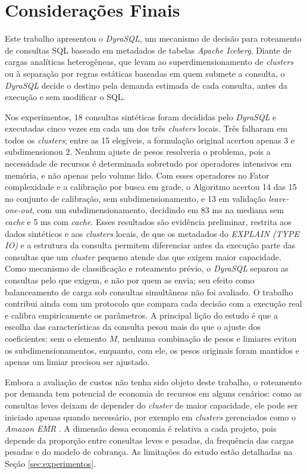 \FloatBarrier
\section{Considerações Finais}
\label{sec:consideracoes-finais}
\label{sec:con}

Este trabalho apresentou o \textit{DyraSQL}, um mecanismo de decisão para roteamento de consultas SQL baseado em metadados de tabelas \textit{Apache Iceberg}. Diante de cargas analíticas heterogêneas, que levam ao superdimensionamento de \textit{clusters} ou à separação por regras estáticas baseadas em quem submete a consulta, o \textit{DyraSQL} decide o destino pela demanda estimada de cada consulta, antes da execução e sem modificar o SQL.

Nos experimentos, 18 consultas sintéticas foram decididas pelo \textit{DyraSQL} e executadas cinco vezes em cada um dos três \textit{clusters} locais. Três falharam em todos os \textit{clusters}; entre as 15 elegíveis, a formulação original acertou apenas 3 e subdimensionou 2. Nenhum ajuste de pesos resolveria o problema, pois a necessidade de recursos é determinada sobretudo por operadores intensivos em memória, e não apenas pelo volume lido. Com esses operadores no Fator complexidade e a calibração por busca em grade, o Algoritmo acertou 14 das 15 no conjunto de calibração, sem subdimensionamento, e 13 em validação \textit{leave-one-out}, com um subdimensionamento, decidindo em 83 ms na mediana sem \textit{cache} e 5 ms com \textit{cache}. Esses resultados são evidência preliminar, restrita aos dados sintéticos e aos \textit{clusters} locais, de que os metadados do \textit{EXPLAIN (TYPE IO)} e a estrutura da consulta permitem diferenciar antes da execução parte das consultas que um \textit{cluster} pequeno atende das que exigem maior capacidade. Como mecanismo de classificação e roteamento prévio, o \textit{DyraSQL} separou as consultas pelo que exigem, e não por quem as envia; seu efeito como balanceamento de carga sob consultas simultâneas não foi avaliado. O trabalho contribui ainda com um protocolo que compara cada decisão com a execução real e calibra empiricamente os parâmetros. A principal lição do estudo é que a escolha das características da consulta pesou mais do que o ajuste dos coeficientes: sem o elemento $M$, nenhuma combinação de pesos e limiares evitou os subdimensionamentos, enquanto, com ele, os pesos originais foram mantidos e apenas um limiar precisou ser ajustado.

Embora a avaliação de custos não tenha sido objeto deste trabalho, o roteamento por demanda tem potencial de economia de recursos em alguns cenários: como as consultas leves deixam de depender do \textit{cluster} de maior capacidade, ele pode ser iniciado apenas quando necessário, por exemplo em \textit{clusters} gerenciados como o \textit{Amazon EMR} \cite{awsemr2025}. A dimensão dessa economia é relativa a cada projeto, pois depende da proporção entre consultas leves e pesadas, da frequência das cargas pesadas e do modelo de cobrança. As limitações do estudo estão detalhadas na Seção \ref{sec:experimentos}.


